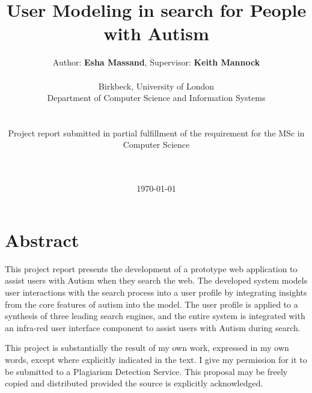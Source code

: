\documentclass[a4paper, 11pt]{article}
\begin{document}
\LARGE\title{User Modeling in search for People with Autism}

\LARGE\author{Author: \textbf{Esha Massand}, Supervisor: \textbf{Keith Mannock}\\
\\
Birkbeck, University of London\\Department of Computer Science and Information Systems\\\\\\Project report submitted in partial fulfillment of the requirement for the MSc in Computer Science\date{\mydate\today}
\\\
}

\normalsize


\maketitle


\section*{Abstract}
\begin{justify}
This project report presents the development of a prototype web application to assist users with Autism when they search the web. The developed system models user interactions with the search process into a user profile by integrating insights from the core features of autism into the model. The user profile is applied to a synthesis of three leading search engines, and the entire system is integrated with an infra-red user interface component to assist users with Autism during search.\\
\end{justify}


\begin{justify}
This project is substantially the result of my own work, expressed in my own words, except where explicitly indicated in the text. I give my permission for it to be submitted to a Plagiarism Detection Service. This proposal may be freely copied and distributed provided the source is explicitly acknowledged.
\end{justify}

\begin{verbatim}














\end{verbatim}
\end{document}
